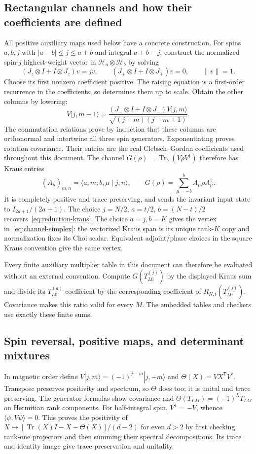 \documentclass[11pt,a4paper]{article}
\begin{document}
\subsection{Rectangular channels and how their coefficients are defined}
All positive auxiliary maps used below have a concrete construction.
For spins $a,b,j$ with $|a-b|\le j\le a+b$ and integral $a+b-j$,
construct the normalized spin-$j$ highest-weight vector in
$\mathcal H_a\otimes\mathcal H_b$ by solving
\[
 (J_z\otimes I+I\otimes J_z)v=jv,\qquad
 (J_+\otimes I+I\otimes J_+)v=0,\qquad\|v\|=1.
\]
Choose its first nonzero coefficient positive. The raising equation is
a first-order recurrence in the coefficients, so determines them up
to scale. Obtain the other columns by lowering:
\[
 V|j,m-1\rangle=
 \frac{(J_-\otimes I+I\otimes J_-)V|j,m\rangle}
 {\sqrt{(j+m)(j-m+1)}}.
\]
The commutation relations prove by induction that these columns are
orthonormal and intertwine all three spin generators. Exponentiating
proves rotation covariance. Their entries are the real
Clebsch--Gordan coefficients used throughout this document.
The channel $G(\rho)=\operatorname{Tr}_b(V\rho V^\dagger)$ therefore
has Kraus entries
\[
 (A_\mu)_{m,n}=\langle a,m;b,\mu\mid j,n\rangle,
 \qquad G(\rho)=\sum_{\mu=-b}^b A_\mu\rho A_\mu^\dagger.
\]
It is completely positive and trace preserving, and sends the invariant
input state to $I_{2a+1}/(2a+1)$. The choice $j=N/2$, $a=t/2$,
$b=(N-t)/2$ recovers~\eqref{eq:reduction-kraus}.
The choice $a=j,b=K$ gives the vertex in~\eqref{eq:channel-simplex}:
the vectorized Kraus span is its unique rank-$K$ copy and normalization
fixes its Choi scalar. Equivalent adjoint/phase choices in the square
Kraus convention give the same vertex.

Every finite auxiliary multiplier table in this document can therefore
be evaluated without an external convention. Compute $G(T_{L0}^{(j)})$
by the displayed Kraus sum and divide its $T_{L0}^{(a)}$ coefficient
by the corresponding coefficient of $R_{N,t}(T_{L0}^{(j)})$.
Covariance makes this ratio valid for every $M$. The embedded tables
and checkers use exactly these finite sums.

\subsection{Spin reversal, positive maps, and determinant mixtures}
In magnetic order define $V|j,m\rangle=(-1)^{j-m}|j,-m\rangle$ and
$\Theta(X)=VX^{\mathsf T}V^\dagger$. Transpose preserves positivity
and spectrum, so $\Theta$ does too; it is unital and trace preserving.
The generator formulas show covariance and
$\Theta(T_{LM})=(-1)^LT_{LM}$ on Hermitian rank components.
For half-integral spin, $V^{\mathsf T}=-V$, whence
$\langle\psi,V\bar\psi\rangle=0$. This proves the positivity of
$X\mapsto[\operatorname{Tr}(X)I-X-\Theta(X)]/(d-2)$ for even $d>2$
by first checking rank-one projectors and then summing their spectral
decompositions. Its trace and identity image give trace preservation
and unitality.
\end{document}
